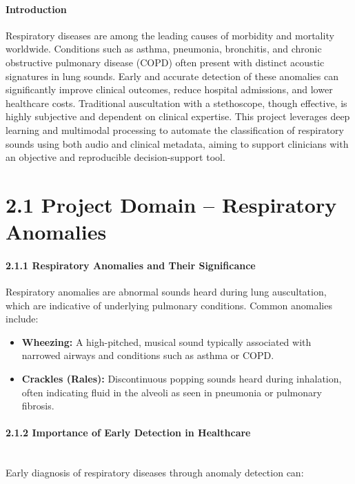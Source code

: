 
\paragraph{Introduction\\}
Respiratory diseases are among the leading causes of morbidity and mortality worldwide. Conditions such as asthma, pneumonia, bronchitis, and chronic obstructive pulmonary disease (COPD) often present with distinct acoustic signatures in lung sounds. Early and accurate detection of these anomalies can significantly improve clinical outcomes, reduce hospital admissions, and lower healthcare costs. Traditional auscultation with a stethoscope, though effective, is highly subjective and dependent on clinical expertise. This project leverages deep learning and multimodal processing to automate the classification of respiratory sounds using both audio and clinical metadata, aiming to support clinicians with an objective and reproducible decision-support tool.
\newpage

\section*{2.1 Project Domain – Respiratory Anomalies}

\paragraph{2.1.1 Respiratory Anomalies and Their Significance\\}
Respiratory anomalies are abnormal sounds heard during lung auscultation, which are indicative of underlying pulmonary conditions. Common anomalies include:

\begin{itemize}
    \item \textbf{Wheezing:} A high-pitched, musical sound typically associated with narrowed airways and conditions such as asthma or COPD.
    \item \textbf{Crackles (Rales):} Discontinuous popping sounds heard during inhalation, often indicating fluid in the alveoli as seen in pneumonia or pulmonary fibrosis.
\end{itemize}

\paragraph{2.1.2 Importance of Early Detection in Healthcare\\\\}
Early diagnosis of respiratory diseases through anomaly detection can:

